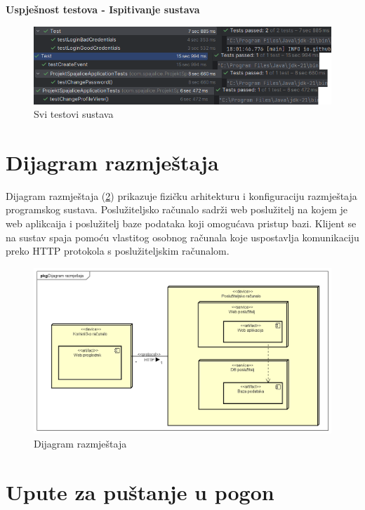 						
						\noindent \textbf{Uspješnost testova - Ispitivanje sustava}
						\begin{figure}[H]
							\includegraphics[width=\textwidth]{slike/ISTestovi.PNG} %
							\caption{Svi testovi sustava}
							\label{fig:ISTS} %
						\end{figure}
						\eject
				
			
		
		
		\section{Dijagram razmještaja}
		Dijagram razmještaja (\ref{fig:DR}) prikazuje fizičku arhitekturu i konfiguraciju razmještaja programskog sustava. Poslužiteljsko računalo sadrži web poslužitelj na kojem je web aplikcaija i poslužitelj baze podataka koji omogućava pristup bazi. Klijent se na sustav spaja pomoću vlastitog osobnog računala koje uspostavlja komunikaciju preko HTTP protokola s poslužiteljskim računalom.  
			
			 \begin{figure}[H]
			\includegraphics[width=\textwidth]{slike/Dijagram razmjestaja.PNG} %
			\caption{Dijagram razmještaja}
			\label{fig:DR} %
		\end{figure}
			\eject 
		
		\section{Upute za puštanje u pogon}
		
